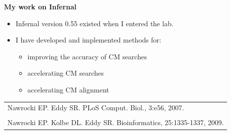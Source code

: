 \documentclass[landscape]{slides}
\begin{document}
\begin{slide}


\vfill

\end{slide}
\begin{slide}
\begin{center}

\textbf{My work on Infernal}
\medskip

\small 
\begin{itemize}
\item Infernal version 0.55 existed when I entered the lab.

\item I have developed and implemented methods for:

\begin{itemize}
\item improving the accuracy of CM searches 
\item accelerating CM searches 
\item accelerating CM alignment 
\end{itemize}
\end{itemize}

\begin{tabular}{l}
Nawrocki EP. Eddy SR. PLoS Comput. Biol., 3:e56, 2007. \\
\\
Nawrocki EP. Kolbe DL. Eddy SR. Bioinformatics, 25:1335-1337, 2009. \\
\end{tabular}
\end{center}

\vfill 
\end{slide}
\end{document}
